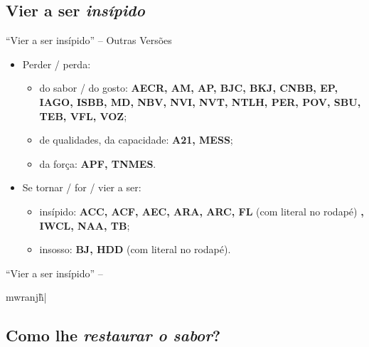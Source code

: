 \documentclass[12pt,aspectratio=169]{beamer}
\newcommand{\YEL}[1]{{\textcolor{TXyel}{#1}}}
\newcommand{\MAG}[1]{{\textcolor{TXmag}{#1}}}
\newcommand{\BRI}[1]{{\textcolor{BSpbg}{#1}}}   %
\newcommand{\GRtxt}[1]{\begin{otherlanguage}{greek}{{#1}}\end{otherlanguage}}
\begin{document}
    \subsection{Vier a ser \textit{insípido\/}}

    \begin{frame}{\BRI{``Vier a ser insípido''} -- Outras Versões}
        \begin{itemize}
            \item<1-> \YEL{Perder} / \YEL{perda}:
                \begin{itemize}
                    \item \YEL{do sabor} / \YEL{do gosto}:
                        \BRI{\textbf{AECR, AM, AP, BJC, BKJ, CNBB, EP, IAGO, ISBB, MD, NBV, NVI,
                            NVT, NTLH, PER, POV, SBU, TEB, VFL, VOZ}};
                    \item \YEL{de qualidades, da capacidade}:
                        \BRI{\textbf{A21, MESS}};
                    \item \YEL{da força}:
                        \BRI{\textbf{APF, TNMES}}.
                \end{itemize}
            \item<2-> \YEL{Se tornar} / \YEL{for} / \YEL{vier a ser}:
                \begin{itemize}
                    \item \YEL{insípido}:
                        \BRI{\textbf{ACC, ACF, AEC, ARA, ARC, FL}} (com \MAG{literal} no rodapé)%
                        \BRI{\textbf{, IWCL, NAA, TB}};
                    \item \YEL{insosso}:
                        \BRI{\textbf{BJ, HDD}} (com \MAG{literal} no rodapé).
                \end{itemize}
        \end{itemize}
    \end{frame}

    \begin{frame}{\BRI{``Vier a ser insípido''} -- \GRtxt{mwranj\~h|}}
    \end{frame}

    \subsection{Como lhe \textit{restaurar o sabor\/}?}
\end{document}

